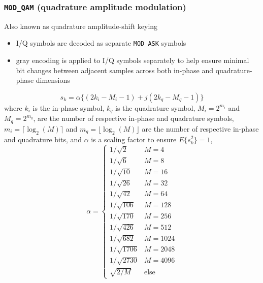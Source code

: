 \subsubsection{{\tt MOD\_QAM} (quadrature amplitude modulation)}
Also known as quadrature amplitude-shift keying
\begin{itemize}
\item I/Q symbols are decoded as separate {\tt MOD\_ASK} symbols
\item gray encoding is applied to I/Q symbols separately to help ensure
minimal bit changes between adjacent samples across both in-phase and
quadrature-phase dimensions
\end{itemize}

\[
    s_k = \alpha \{ ( 2 k_i - M_i - 1 ) + j(2 k_q - M_q - 1) \}
\]
where
$k_i$ is the in-phase symbol,
$k_q$ is the quadrature symbol,
$M_i = 2^{m_i}$ and $M_q = 2^{m_q}$, are the number of respective in-phase and
quadrature symbols,
$m_i=\lceil \log_2(M) \rceil$ and $m_q=\lfloor \log_2(M) \rfloor$ are the
number of respective in-phase and quadrature bits, and
$\alpha$ is a scaling factor to ensure $E\{s_k^2\}=1$,
\[
    \alpha = 
    \begin{cases}
    1/\sqrt{2}      &   M=4     \\
    1/\sqrt{6}      &   M=8     \\
    1/\sqrt{10}     &   M=16    \\
    1/\sqrt{26}     &   M=32    \\
    1/\sqrt{42}     &   M=64    \\
    1/\sqrt{106}    &   M=128   \\
    1/\sqrt{170}    &   M=256   \\
    1/\sqrt{426}    &   M=512   \\
    1/\sqrt{682}    &   M=1024  \\
    1/\sqrt{1706}   &   M=2048  \\
    1/\sqrt{2730}   &   M=4096  \\
    \sqrt{2/M}      &   \text{else}
    \end{cases}
\]




